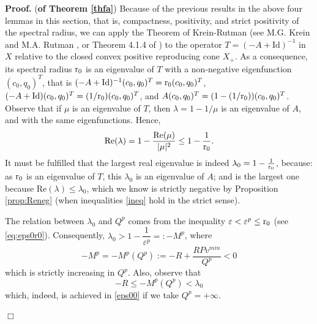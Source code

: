 \documentclass[a4paper]{article}
\def\Re{{\textrm{Re}}}
\def\Id{\rm{Id}}
\def\r{{\rm{r}}}
\def\Id{\mathrm{Id}}
\numberwithin{equation}{section}
\newenvironment{pf}{\vspace{0.5em}\noindent\textbf{Proof.} }{\quad \hfill $\Box$ \\ \vspace{0.2em}\\}
\begin{document}
\begin{pf}({\bf of Theorem \ref{thfa}})
Because of the previous results in the above four lemmas in this section, that is, compactness, positivity, and strict positivity of the spectral radius, we can apply the Theorem of Krein-Rutman (see M.G. Krein and M.A. Rutman \cite{KR}, or Theorem 4.1.4 of \cite{Meyer}) to the operator $T=(-A+\Id)^{-1}$ in $X$ relative to the closed convex positive reproducing cone $X_+$. As a consequence, its spectral radius $\r_0$ is an eigenvalue of $T$ with a non-negative eigenfunction $(c_0,q_0)^T$, that is $(-A+\Id)^{-1}(c_0,q_0)^T=\r_0(c_0,q_0)^T$, $(-A+\Id)(c_0,q_0)^T=(1/\r_0)(c_0,q_0)^T$, and $A(c_0,q_0)^T=(1-(1/\r_0))(c_0,q_0)^T$. Observe that if $\mu$ is an eigenvalue of $T$, then $\lambda=1-1/\mu$ is an eigenvalue of $A$, and with the same eigenfunctions. Hence,
$$\Re (\lambda) = 1-  \dfrac{\Re(\mu)}{|\mu|^2} \leq 1-\dfrac{1}{\r_0}.$$
It must be fulfilled that the largest real eigenvalue is indeed $\lambda_0=1-\frac{1}{\r_0}$, because:  as $\r_0$ is an eigenvalue of $T$, this $\lambda_0$ is an eigenvalue of $A$; and is the largest one because  $\Re (\lambda)\leq \lambda_0$, which we know is strictly negative by Proposition \ref{prop:Reneg} (when inequalities \eqref{ineq} hold in the strict sense).

The relation between $\lambda_0$ and $Q^p$ comes from the inequality  $\varepsilon <\varepsilon^p\le\r_0$ (see \eqref{eq:eps0r0}). Consequently, $\lambda_0>1-\dfrac{1}{\varepsilon^p}=:- M^p$, where
\begin{equation}\label{eps00}
-M^p = -M^p(Q^p) := -R+\dfrac{RPv^{min}}{Q^p} <0
\end{equation}
which is strictly increasing in $Q^p$. Also, observe that
\begin{equation}\label{eq:Rlow}
-R \leq -M^p(Q^p)< \lambda_0
\end{equation}
which, indeed, is achieved in \eqref{eps00} if we take $Q^p=+\infty$.


\end{pf}
\end{document}
